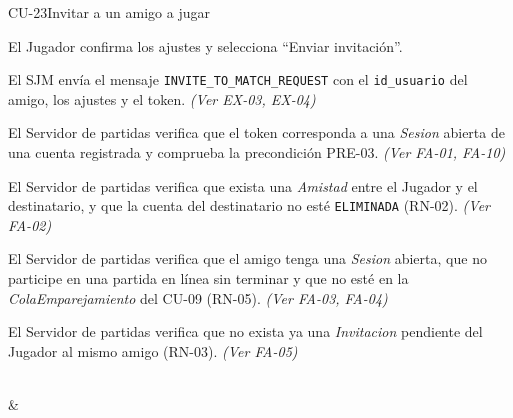 \begin{fichacu}{CU-23}{Invitar a un amigo a jugar}
{\begin{cuenum}[start=1]
      \item El Jugador confirma los ajustes y selecciona ``Enviar invitación''.
      \item El SJM envía el mensaje \texttt{INVITE\_\allowbreak{}TO\_\allowbreak{}MATCH\_\allowbreak{}REQUEST} con el \texttt{id\_\allowbreak{}usuario} del amigo, los ajustes y el token. \textit{(Ver \mbox{EX-03}, \mbox{EX-04})}
      \item El Servidor de partidas verifica que el token corresponda a una \textit{Sesion} abierta de una cuenta registrada y comprueba la precondición \mbox{PRE-03}. \textit{(Ver \mbox{FA-01}, \mbox{FA-10})}
      \item El Servidor de partidas verifica que exista una \textit{Amistad} entre el Jugador y el destinatario, y que la cuenta del destinatario no esté \texttt{ELIMINADA} (\mbox{RN-02}). \textit{(Ver \mbox{FA-02})}
      \item El Servidor de partidas verifica que el amigo tenga una \textit{Sesion} abierta, que no participe en una partida en línea sin terminar y que no esté en la \textit{ColaEmparejamiento} del \mbox{CU-09} (\mbox{RN-05}). \textit{(Ver \mbox{FA-03}, \mbox{FA-04})}
      \item El Servidor de partidas verifica que no exista ya una \textit{Invitacion} pendiente del Jugador al mismo amigo (\mbox{RN-03}). \textit{(Ver \mbox{FA-05})}
    \end{cuenum}} \\
   & 
\end{fichacu}
